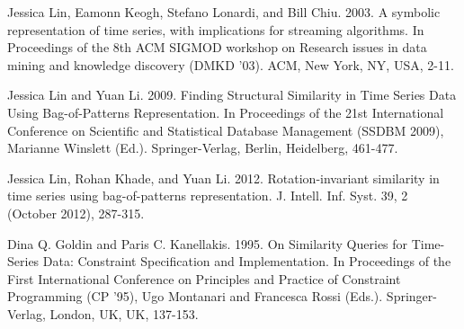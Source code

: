 \documentclass{llncs}
\begin{document}
\begin{thebibliography}{5}
Jessica Lin, Eamonn Keogh, Stefano Lonardi, and Bill Chiu. 2003. A symbolic representation of time
series, with implications for streaming algorithms. In Proceedings of the 8th ACM SIGMOD workshop on
Research issues in data mining and knowledge discovery (DMKD '03). ACM, New York, NY, USA, 2-11.

Jessica Lin and Yuan Li. 2009. Finding Structural Similarity in Time Series Data Using
Bag-of-Patterns Representation. In Proceedings of the 21st International Conference on Scientific
and Statistical Database Management (SSDBM 2009), Marianne Winslett (Ed.). Springer-Verlag, Berlin,
Heidelberg, 461-477.

Jessica Lin, Rohan Khade, and Yuan Li. 2012. Rotation-invariant similarity in time series using
bag-of-patterns representation. J. Intell. Inf. Syst. 39, 2 (October 2012), 287-315.

Dina Q. Goldin and Paris C. Kanellakis. 1995. On Similarity Queries for Time-Series Data: Constraint
Specification and Implementation. In Proceedings of the First International Conference on Principles
and Practice of Constraint Programming (CP '95), Ugo Montanari and Francesca Rossi (Eds.).
Springer-Verlag, London, UK, UK, 137-153.

\end{thebibliography}

%
\end{document}
